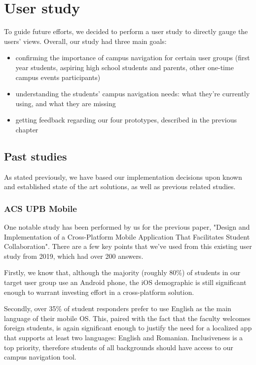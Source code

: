 \chapter{User study} \label{chapter:user_study}

    To guide future efforts, we decided to perform a user study to directly gauge the users' views. Overall, our study had three main goals:
    
    \begin{itemize}
        \item confirming the importance of campus navigation for certain user groups (first year students, aspiring high school students and parents, other one-time campus events participants)
        
        \item understanding the students' campus navigation needs: what they're currently using, and what they are missing
    
        \item getting feedback regarding our four prototypes, described in the previous chapter
    \end{itemize}

\section{Past studies}

    As stated previously, we have based our implementation decisions upon known and established state of the art solutions, as well as previous related studies.
    
    \subsection{ACS UPB Mobile}
    
        One notable study has been performed by us for the previous paper, "Design and Implementation of a Cross-Platform Mobile Application That Facilitates Student Collaboration"\cite{alexandru2020acsupbmobile}. There are a few key points that we've used from this existing user study from 2019, which had over 200 answers.
        
        Firstly, we know that, although the majority (roughly 80\%) of students in our target user group use an Android phone, the iOS demographic is still significant enough to warrant investing effort in a cross-platform solution.
        
        Secondly, over 35\% of student responders prefer to use English as the main language of their mobile OS. This, paired with the fact that the faculty welcomes foreign students, is again significant enough to justify the need for a localized app that supports at least two languages: English and Romanian. Inclusiveness is a top priority, therefore students of all backgrounds should have access to our campus navigation tool.
        
